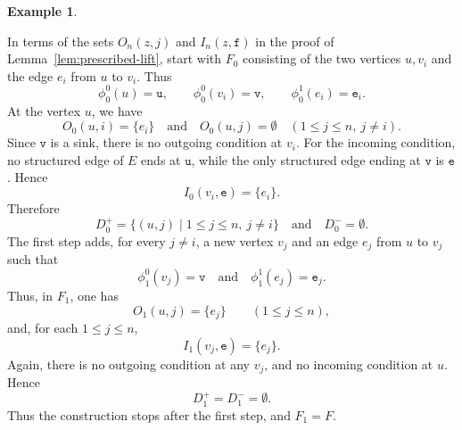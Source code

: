 \documentclass{article}
\theoremstyle{definition}
\newtheorem{example}{Example}
\begin{document}
\begin{example}
\begin{figure}[H]
\begin{tikzpicture}[>=stealth, node distance=2.5cm]
\end{tikzpicture}
\end{figure}
In terms of the sets $O_n(z,j)$ and $I_n(z,\mathtt{f})$ in the proof of
Lemma~\ref{lem:prescribed-lift}, start with $F_0$ consisting of the two
vertices $u,v_i$ and the edge $e_i$ from $u$ to $v_i$. Thus
$$
\phi_0^0(u)=\mathtt{u},\qquad \phi_0^0(v_i)=\mathtt{v},\qquad
\phi_0^1(e_i)=\mathtt{e}_i.
$$
At the vertex $u$, we have
$$
O_0(u,i)=\{e_i\}\quad\text{and}\quad
O_0(u,j)=\emptyset\quad (1\leq j\leq n,\ j\neq i).
$$
Since $\mathtt{v}$ is a sink, there is no outgoing condition at $v_i$.
For the incoming condition, no structured edge of $E$ ends at $\mathtt{u}$,
while the only structured edge ending at $\mathtt{v}$ is $\mathtt{e}$. Hence
$$
I_0(v_i,\mathtt{e})=\{e_i\}.
$$
Therefore
$$
D_0^+=\{(u,j)\mid 1\leq j\leq n,\ j\neq i\}\quad\text{and}\quad D_0^-=\emptyset.
$$
The first step adds, for every $j\neq i$, a new vertex $v_j$ and an edge $e_j$ from $u$ to $v_j$ such that
$$
\phi_1^0(v_j)=\mathtt{v}\quad\text{and}\quad \phi_1^1(e_j)=\mathtt{e}_j.
$$
Thus, in $F_1$, one has
$$
O_1(u,j)=\{e_j\}\qquad (1\leq j\leq n),
$$
and, for each $1\leq j\leq n$,
$$
I_1(v_j,\mathtt{e})=\{e_j\}.
$$
Again, there is no outgoing condition at any $v_j$, and no incoming condition
at $u$. Hence
$$
D_1^+=D_1^-=\emptyset.
$$
Thus the construction stops after the first step, and $F_1=F$.
\end{example}
\end{document}
